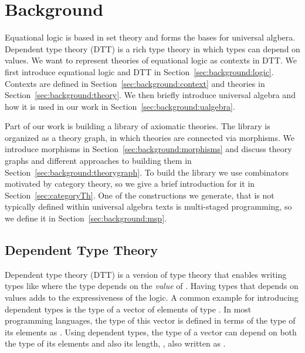 \chapter{Background}
\label{ch:background}


Equational logic is based in set theory and forms the bases for universal algbera.  Dependent type theory (DTT) is a rich type theory in which types can depend on values. We want to represent theories of equational logic as contexts in DTT. We first introduce equational logic and DTT in Section~\ref{sec:background:logic}. 
Contexts are defined in Section~\ref{sec:background:context} and theories in Section~\ref{sec:background:theory}. We then briefly introduce universal algebra and how it is used in our work in Section~\ref{sec:background:ualgebra}. 

Part of our work is building a library of axiomatic theories. The library is organized as a theory graph, in which theories are connected via morphisms. We introduce morphisms in Section~\ref{sec:background:morphisms} and discuss theory graphs and different approaches to building them in Section~\ref{sec:background:theorygraph}. 
To build the library we use combinators motivated by category theory, so we give a brief introduction for it in Section~\ref{sec:categoryTh}. 
One of the constructions we generate, that is not typically defined within universal algebra texts is multi-staged programming, so we define it in Section~\ref{sec:background:msp}. 


\section{Dependent Type Theory}
\label{subsec:background:dtt}
Dependent type theory (DTT) is a version of type theory that enables writing types like  where the type  depends on the \emph{value} of . 
Having types that depends on values adds to the expressiveness of the logic. A common example for introducing dependent types is the type of a vector of  elements of type . 
In most programming languages, the type of this vector is defined in terms of the type of its elements as . Using dependent types, the type of a vector can depend on both the type of its elements and also its length, , also written as .
 
